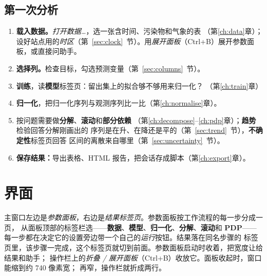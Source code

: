 \documentclass[11pt]{ctexrep}
\newcommand{\nosep}{\setlength{\itemsep}{0pt}\setlength{\parskip}{0pt}\setlength{\topsep}{2pt}}
\newcommand{\tab}[1]{\textbf{#1}}
\begin{document}
\section{第一次分析}
\begin{enumerate}\nosep
  \item \tab{载入数据。}\emph{打开数据…}，选一张含时间、污染物和气象的表
        （第\ref{ch:data}章）；设好站点用的\emph{时区}（第~\ref{sec:clock}~节）。用\emph{展开面板}（Ctrl+B）展开参数面板，或直接问助手。
  \item \tab{选择列。}检查目标，勾选预测变量（第~\ref{sec:columns}~节）。
  \item \tab{训练}，读\tab{模型}标签页：留出集上的拟合够不够用来归一化？
        （第\ref{ch:train}章）
  \item \tab{归一化}，把归一化序列与观测序列比一比（第\ref{ch:normalise}章）。
  \item 按问题需要做\tab{分解}、\tab{滚动}和\tab{部分依赖}
        （第\ref{ch:decompose}--\ref{ch:pdp}章）；\tab{趋势}检验回答分解刚画出的
        序列是在升、在降还是平的（第~\ref{sec:trend}~节），\tab{不确定性}标签页回答
        区间的离散来自哪里（第~\ref{sec:uncertainty}~节）。
  \item \tab{保存结果：}导出表格、HTML 报告，把会话存成脚本（第\ref{ch:export}章）。
\end{enumerate}

\chapter{界面}\label{ch:ui}

主窗口左边是\emph{参数面板}，右边是\emph{结果标签页}。参数面板按工作流程的每一步分成一页，
从面板顶部的标签栏选——\tab{数据}、\tab{模型}、\tab{归一化}、\tab{分解}、\tab{滚动}和
\tab{PDP}——每一步都在决定它的设置旁边带一个自己的\emph{运行}按钮。结果落在同名步骤的
标签页里，该步骤一完成，这个标签页就切到前面。参数面板启动时收着，把宽度让给结果和助手；
操作栏上的\emph{折叠 / 展开面板}（Ctrl+B）收放它。面板收起时，窗口能缩到约 740 像素宽；
再窄，操作栏就折成两行。
\end{document}
